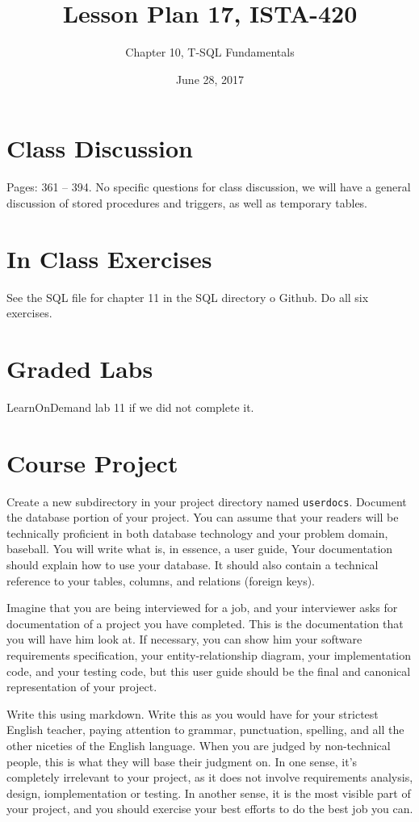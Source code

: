 \documentclass{article}
\title{Lesson Plan 17, ISTA-420}
\author{Chapter 10, T-SQL Fundamentals}
\date{June 28, 2017}
\begin{document}
    

    \maketitle{}

    \section{Class Discussion}

    Pages: 361 -- 394.  No specific questions for class discussion, we will have a general discussion of stored procedures and triggers, as well as temporary tables.

    \section{In Class Exercises}

    See the SQL file for chapter 11 in the SQL directory o Github. Do all six exercises.

    \section{Graded Labs}

    LearnOnDemand lab 11 if we did not complete it.


    \section{Course Project}

    Create a new subdirectory in your project directory named \texttt{userdocs}. Document the database portion of your project. You can assume that your readers will be technically proficient in both database technology and your problem domain, baseball.  You will write what is, in essence, a user guide, Your documentation should explain how to use your database. It should also contain a technical reference to your tables, columns, and relations (foreign keys).

    Imagine that you are being interviewed for a job, and your interviewer asks for documentation of a project you have completed. This is the documentation that you will have him look at. If necessary, you can show him your software requirements specification, your entity-relationship diagram, your implementation code, and your testing code, but this user guide should be the final and canonical representation of your project.

    Write this using markdown.  Write this as you would have for your strictest English teacher, paying attention to grammar, punctuation, spelling, and all the other niceties of the English language. When you are judged by non-technical people, this is what they will base their judgment on. In one sense, it's completely irrelevant to your project, as it does not involve requirements analysis, design, iomplementation or testing. In another sense, it is the most visible part of your project, and you should exercise your best efforts to do the best job you can.
\end{document}
